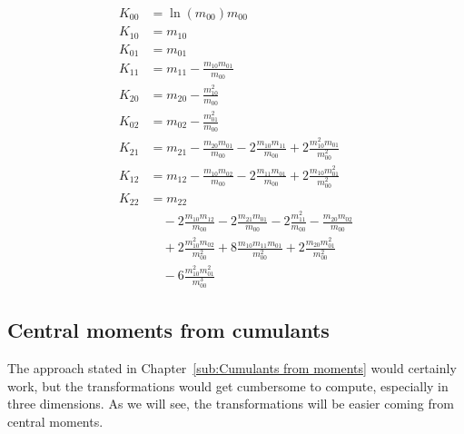\documentclass{article}
\begin{document}
\begin{align}
  K_{00} & = \ln(m_{00})m_{00} \label{eq: K_00 from moments}\\
  K_{10} & = m_{10} \label{eq: K_10 from moments}\\
  K_{01} & = m_{01} \label{eq: K_01 from moments}\\
  K_{11} & = m_{11} - \frac{m_{10}m_{01}}{m_{00}} \label{eq: K_11 from moments} \\
  K_{20} & = m_{20} - \frac{m_{10}^2}{m_{00}} \label{eq: K_20 from moments}\\
  K_{02} & = m_{02} - \frac{m_{01}^2}{m_{00}} \label{eq: K_02 from moments}\\
  K_{21} & = m_{21} - \frac{m_{20}m_{01}}{m_{00}}
       - 2\frac{m_{10}m_{11}}{m_{00}} + 2\frac{m_{10}^2 m_{01}}{m_{00}^2} \label{eq: K_21 from moments}\\
  K_{12} & = m_{12} - \frac{m_{10}m_{02}}{m_{00}}
       - 2\frac{m_{11}m_{01}}{m_{00}} + 2\frac{m_{10} m_{01}^2}{m_{00}^2} \label{eq: K_12 from moments}\\
  K_{22} & = m_{22} \\
       & \quad - 2 \frac{m_{10}m_{12}}{m_{00}} - 2\frac{m_{21}m_{01}}{m_{00}}
        - 2 \frac{m_{11}^2}{m_{00}} - \frac{m_{20}m_{02}}{m_{00}} \\
       & \quad + 2 \frac{m_{10}^2 m_{02}}{m_{00}^2} + 8 \frac{m_{10}m_{11}m_{01}}{m_{00}^2}
        + 2 \frac{m_{20}m_{01}^2}{m_{00}^2} \\
       & \quad - 6 \frac{m_{10}^2 m_{01}^2}{m_{00}^3}\label{eq: K_22 from moments}
\end{align}

\subsection{Central moments from cumulants}
\label{sub:Central moments from cumulants}
The approach stated in Chapter~\ref{sub:Cumulants from moments} would certainly work, but the transformations would get cumbersome to compute, especially in three dimensions. As we will see, the transformations will be easier coming from central moments.
\end{document}
